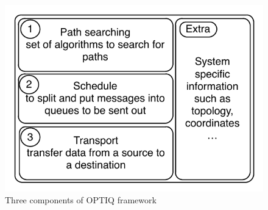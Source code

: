 \begin{figure}[!htb]
\vspace{-0.1in}
\centering
\includegraphics[scale=0.7]{figures/framework.pdf}
\vspace{-0.2in}
\caption{Three components of OPTIQ framework}
\vspace{-0.1in}
\label{fig:framework}
\end{figure}

